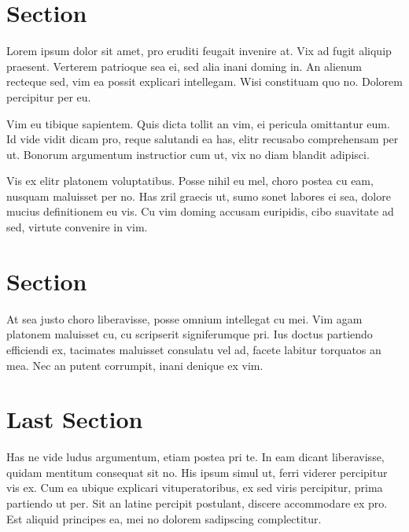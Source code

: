 \documentclass[]{article}
\title{}
\author{}
\begin{document}
\maketitle

\begin{abstract}

\end{abstract}

\section{Section}
Lorem ipsum dolor sit amet, pro eruditi feugait invenire at. Vix ad fugit aliquip praesent. Verterem patrioque sea ei, sed alia inani doming in. An alienum recteque sed, vim ea possit explicari intellegam. Wisi constituam quo no. Dolorem percipitur per eu.

Vim eu tibique sapientem. Quis dicta tollit an vim, ei pericula omittantur eum. Id vide vidit dicam pro, reque salutandi ea has, elitr recusabo comprehensam per ut. Bonorum argumentum instructior cum ut, vix no diam blandit adipisci.

Vis ex elitr platonem voluptatibus. Posse nihil eu mel, choro postea cu eam, nusquam maluisset per no. Has zril graecis ut, sumo sonet labores ei sea, dolore mucius definitionem eu vis. Cu vim doming accusam euripidis, cibo suavitate ad sed, virtute convenire in vim.

\section{Section}
At sea justo choro liberavisse, posse omnium intellegat cu mei. Vim agam platonem maluisset cu, cu scripserit signiferumque pri. Ius doctus partiendo efficiendi ex, tacimates maluisset consulatu vel ad, facete labitur torquatos an mea. Nec an putent corrumpit, inani denique ex vim.


\section{Last Section}
Has ne vide ludus argumentum, etiam postea pri te. In eam dicant liberavisse, quidam mentitum consequat sit no. His ipsum simul ut, ferri viderer percipitur vis ex. Cum ea ubique explicari vituperatoribus, ex sed viris percipitur, prima partiendo ut per. Sit an latine percipit postulant, discere accommodare ex pro. Est aliquid principes ea, mei no dolorem sadipscing complectitur.
\end{document}
